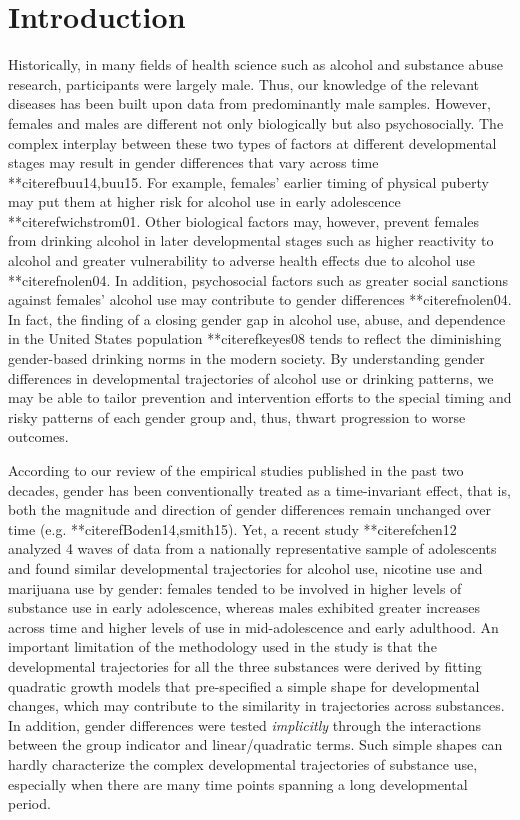 \section{Introduction} 
Historically, in many fields of health
science such as alcohol and substance abuse research, participants
were largely male. Thus, our knowledge of the relevant diseases
has been built upon data from predominantly male samples. However,
females and males are different not only biologically but also
psychosocially. The complex interplay between these two types of
factors at different developmental stages may result in gender
differences that vary across time **citeref{buu14,buu15}. For example,
females' earlier timing of physical puberty may put them at higher
risk for alcohol use in early adolescence **citeref{wichstrom01}.
Other biological factors may, however, prevent females from
drinking alcohol in later developmental stages such as higher
reactivity to alcohol and greater vulnerability to adverse health
effects due to alcohol use **citeref{nolen04}. In addition,
psychosocial factors such as greater social sanctions against
females' alcohol use may contribute to gender differences
**citeref{nolen04}. In fact, the finding of a closing gender gap in
alcohol use, abuse, and dependence in the United States population
**citeref{keyes08} tends to reflect the diminishing gender-based
drinking norms in the modern society. By understanding gender
differences in developmental trajectories of alcohol use or
drinking patterns, we may be able to tailor prevention and
intervention efforts to the special timing and risky patterns of
each gender group and, thus, thwart progression to worse outcomes.

According to our review of the empirical studies published in the
past two decades, gender has been conventionally treated as a
time-invariant effect, that is, both the magnitude and direction
of gender differences remain unchanged over time (e.g.
**citeref{Boden14,smith15}). Yet, a recent study **citeref{chen12}
analyzed 4 waves of data from a nationally representative sample
of adolescents and found similar developmental trajectories for
alcohol use, nicotine use and marijuana use by gender: females
tended to be involved in higher levels of substance use in early
adolescence, whereas males exhibited greater increases across time
and higher levels of use in mid-adolescence and early adulthood.
An important limitation of the methodology used in the study is
that the developmental trajectories for all the three substances
were derived by fitting quadratic growth models that pre-specified
a simple shape for developmental changes, which may contribute to
the similarity in trajectories across substances. In addition,
gender differences were tested \emph{implicitly} through the
interactions between the group indicator and linear/quadratic
terms. Such simple shapes can hardly characterize the complex
developmental trajectories of substance use, especially when there
are many time points spanning a long developmental period.


